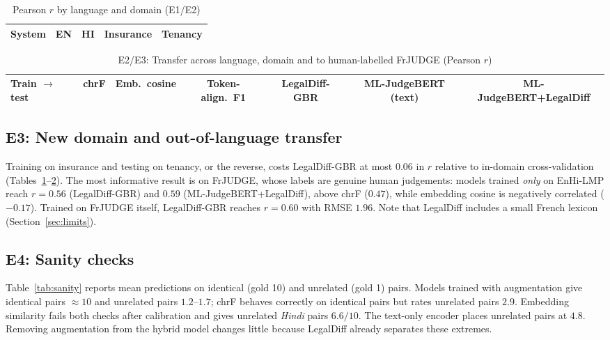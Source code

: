 \begin{table}[t]
\caption{Pearson $r$ by language and domain (E1/E2)}\label{tab:lang}
\centering\footnotesize
\begin{tabular}{@{}lcccc@{}}
\toprule
System & EN & HI & Insurance & Tenancy\\
\midrule

\bottomrule
\end{tabular}
\end{table}

\begin{table}[t]
\caption{E2/E3: Transfer across language, domain and to human-labelled FrJUDGE (Pearson $r$)}\label{tab:transfer}
\centering\footnotesize
\begin{tabular}{@{}lcccccc@{}}
\toprule
Train $\rightarrow$ test & chrF & Emb.\ cosine & Token-align.\ F1 & LegalDiff-GBR & ML-JudgeBERT (text) & ML-JudgeBERT+LegalDiff\\
\midrule

\bottomrule
\end{tabular}
\end{table}

\subsection{E3: New domain and out-of-language transfer}
Training on insurance and testing on tenancy, or the reverse, costs LegalDiff-GBR at most $0.06$ in $r$ relative to in-domain cross-validation (Tables~\ref{tab:lang}--\ref{tab:transfer}). The most informative result is on FrJUDGE, whose labels are genuine human judgements: models trained \emph{only} on EnHi-LMP reach $r=0.56$ (LegalDiff-GBR) and $0.59$ (ML-JudgeBERT+LegalDiff), above chrF ($0.47$), while embedding cosine is negatively correlated ($-0.17$). Trained on FrJUDGE itself, LegalDiff-GBR reaches $r=0.60$ with RMSE $1.96$. Note that LegalDiff includes a small French lexicon (Section~\ref{sec:limits}).

\subsection{E4: Sanity checks}
Table~\ref{tab:sanity} reports mean predictions on identical (gold 10) and unrelated (gold 1) pairs. Models trained with augmentation give identical pairs $\approx10$ and unrelated pairs $1.2$--$1.7$; chrF behaves correctly on identical pairs but rates unrelated pairs $2.9$. Embedding similarity fails both checks after calibration and gives unrelated \emph{Hindi} pairs $6.6/10$. The text-only encoder places unrelated pairs at $4.8$. Removing augmentation from the hybrid model changes little because LegalDiff already separates these extremes.

